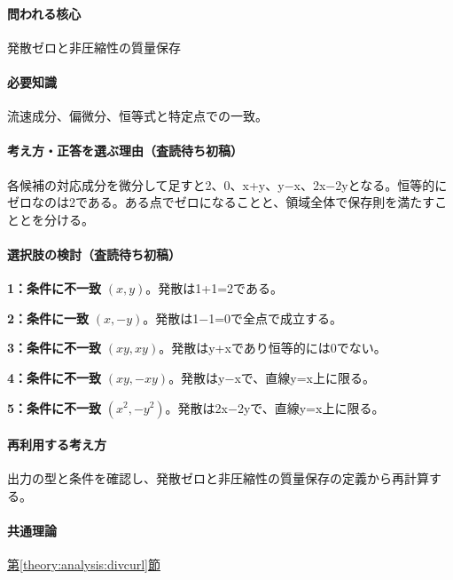 \paragraph{問われる核心} 発散ゼロと非圧縮性の質量保存

\paragraph{必要知識} 流速成分、偏微分、恒等式と特定点での一致。

\paragraph{考え方・正答を選ぶ理由（査読待ち初稿）} 各候補の対応成分を微分して足すと2、0、x+y、y−x、2x−2yとなる。恒等的にゼロなのは2である。ある点でゼロになることと、領域全体で保存則を満たすこととを分ける。

\paragraph{選択肢の検討（査読待ち初稿）}\mbox{}\par

\noindent\textbf{1：条件に不一致} \((x,y)\)。発散は1+1=\allowbreak{}2である。\par

\noindent\textbf{2：条件に一致} \((x,-y)\)。発散は1−1=\allowbreak{}0で全点で成立する。\par

\noindent\textbf{3：条件に不一致} \((xy,xy)\)。発散はy+xであり恒等的には0でない。\par

\noindent\textbf{4：条件に不一致} \((xy,-xy)\)。発散はy−xで、直線y=\allowbreak{}x上に限る。\par

\noindent\textbf{5：条件に不一致} \((x^2,-y^2)\)。発散は2x−2yで、直線y=\allowbreak{}x上に限る。\par

\paragraph{再利用する考え方} 出力の型と条件を確認し、発散ゼロと非圧縮性の質量保存の定義から再計算する。

\paragraph{共通理論} \hyperref[theory:analysis:divcurl]{第\ref*{theory:analysis:divcurl}節}

